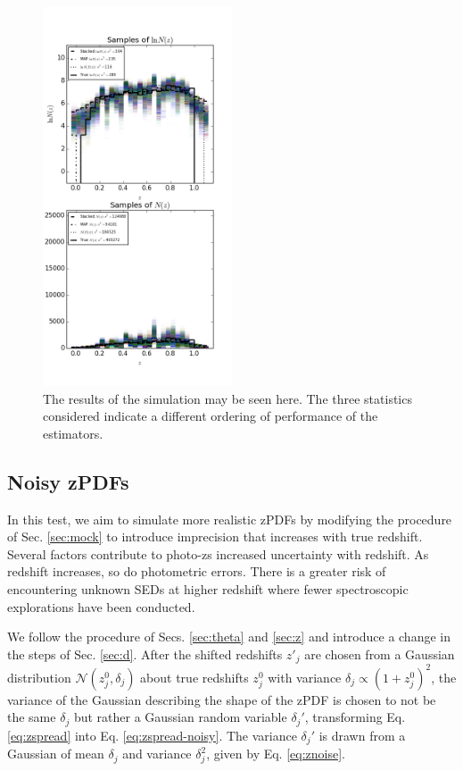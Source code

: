 \documentclass[preprint]{aastex}
\begin{document}
\begin{figure}
\includegraphics[width=0.5\textwidth]{samps-real.png}
\caption{The results of the simulation may be seen here.  The three statistics considered indicate a different ordering of performance of the estimators.}
\label{fig:nullparam}
\end{figure}

\clearpage
\subsection{Noisy zPDFs}
\label{sec:noisy}

In this test, we aim to simulate more realistic zPDFs by modifying the procedure of Sec. \ref{sec:mock} to introduce imprecision that increases with true redshift.  Several factors contribute to photo-zs increased uncertainty with redshift.  As redshift increases, so do photometric errors.  There is a greater risk of encountering unknown SEDs at higher redshift where fewer spectroscopic explorations have been conducted.  

We follow the procedure of Secs. \ref{sec:theta} and \ref{sec:z} and introduce a change in the steps of Sec. \ref{sec:d}.  After the shifted redshifts $z'_{j}$ are chosen from a Gaussian distribution $\mathcal{N}(z_{j}^{0},\delta_{j})$ about true redshifts $z_{j}^{0}$ with variance $\delta_{j}\propto(1+z_{j}^{0})^{2}$, the variance of the Gaussian describing the shape of the zPDF is chosen to not be the same $\delta_{j}$ but rather a Gaussian random variable $\delta_{j}'$, transforming Eq. \ref{eq:zspread} into Eq. \ref{eq:zspread-noisy}.  The variance $\delta_{j}'$ is drawn from a Gaussian of mean $\delta_{j}$ and variance $\delta_{j}^{2}$, given by Eq. \ref{eq:znoise}.
\end{document}
